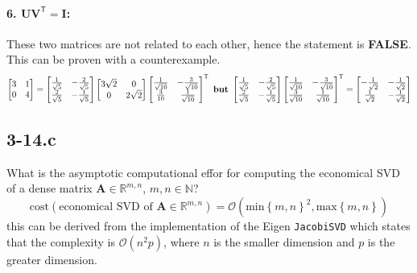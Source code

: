 \documentclass{article}
\begin{document}
\paragraph{6. $\mathbf{U}\mathbf{V}^{\mathsf{T}} = \mathbf{I}$:} These two matrices are not related to each other, hence the statement is \textbf{FALSE}. This can be proven with a counterexample.
\begin{equation*}
    \begin{bmatrix}
    3 & 1 \\
    0 & 4
    \end{bmatrix} = 
    \begin{bmatrix}
        \frac{1}{\sqrt{5}} & -\frac{2}{\sqrt{5}} \\
        \frac{2}{\sqrt{5}} & -\frac{1}{\sqrt{5}}
    \end{bmatrix} 
    \begin{bmatrix}
        3\sqrt{2} & 0 \\
        0 & 2\sqrt{2}
    \end{bmatrix}
    \begin{bmatrix}
        \frac{1}{\sqrt{10}} & -\frac{3}{\sqrt{10}} \\
        \frac{3}{10} & \frac{1}{\sqrt{10}}
    \end{bmatrix}^{\mathsf{T}} \text{ \textbf{but} } \begin{bmatrix}
        \frac{1}{\sqrt{5}} & -\frac{2}{\sqrt{5}} \\
        \frac{2}{\sqrt{5}} & -\frac{1}{\sqrt{5}}
    \end{bmatrix}  \begin{bmatrix}
        \frac{1}{\sqrt{10}} & -\frac{3}{\sqrt{10}} \\
        \frac{3}{\sqrt{10}} & \frac{1}{\sqrt{10}}
    \end{bmatrix}^{\mathsf{T}} = \begin{bmatrix}
        -\frac{1}{\sqrt{2}} &  -\frac{1}{\sqrt{2}} \\
         \frac{1}{\sqrt{2}} &  -\frac{1}{\sqrt{2}}
    \end{bmatrix} 
\end{equation*}

\subsection*{3-14.c}
What is the asymptotic computational effor for computing the economical SVD of a dense matrix $\mathbf{A}\in \mathbb{R}^{m,n}$, $m,n \in  \mathbb{N}$?
\begin{equation*}
    \text{cost}\left(\text{economical SVD of 
 $\mathbf{A}\in \mathbb{R}^{m,n}$}\right) = \mathcal{O}\left(\text{min}\left\{m,n\right\}^{2}, \text{max}\left\{m,n\right\}\right)
\end{equation*}
this can be derived from the implementation of the Eigen \verb|JacobiSVD| which states that the complexity is $\mathcal{O}\left(n^{2}p\right)$, where $n$ is the smaller dimension and $p$ is the greater dimension.
\end{document}
